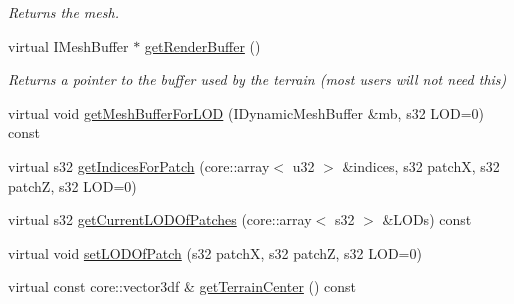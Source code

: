 \begin{DoxyCompactItemize}
\begin{DoxyCompactList}\small\item\em Returns the mesh. \end{DoxyCompactList}\item 
\hypertarget{classirr_1_1scene_1_1_c_terrain_scene_node_a78b649a7eec9d5cd9b84449858ab25fb}{virtual I\-Mesh\-Buffer $\ast$ \hyperlink{classirr_1_1scene_1_1_c_terrain_scene_node_a78b649a7eec9d5cd9b84449858ab25fb}{get\-Render\-Buffer} ()}\label{classirr_1_1scene_1_1_c_terrain_scene_node_a78b649a7eec9d5cd9b84449858ab25fb}

\begin{DoxyCompactList}\small\item\em Returns a pointer to the buffer used by the terrain (most users will not need this) \end{DoxyCompactList}\item 
virtual void \hyperlink{classirr_1_1scene_1_1_c_terrain_scene_node_a2867dd7ecb1150d4ccc8598542e59126}{get\-Mesh\-Buffer\-For\-L\-O\-D} (I\-Dynamic\-Mesh\-Buffer \&mb, s32 L\-O\-D=0) const 
\item 
virtual s32 \hyperlink{classirr_1_1scene_1_1_c_terrain_scene_node_a51de8d7ff1cfe4cf4d0dd288ab50c14c}{get\-Indices\-For\-Patch} (core\-::array$<$ u32 $>$ \&indices, s32 patch\-X, s32 patch\-Z, s32 L\-O\-D=0)
\item 
virtual s32 \hyperlink{classirr_1_1scene_1_1_c_terrain_scene_node_aa2832de1cc9bd349490473d151aea2c4}{get\-Current\-L\-O\-D\-Of\-Patches} (core\-::array$<$ s32 $>$ \&L\-O\-Ds) const 
\item 
virtual void \hyperlink{classirr_1_1scene_1_1_c_terrain_scene_node_a71fc289346513dfdaf17942e21ef967b}{set\-L\-O\-D\-Of\-Patch} (s32 patch\-X, s32 patch\-Z, s32 L\-O\-D=0)
\item 
\hypertarget{classirr_1_1scene_1_1_c_terrain_scene_node_a19359cbd20636918ae7ed2be4c6e9ee5}{virtual const core\-::vector3df \& \hyperlink{classirr_1_1scene_1_1_c_terrain_scene_node_a19359cbd20636918ae7ed2be4c6e9ee5}{get\-Terrain\-Center} () const }\label{classirr_1_1scene_1_1_c_terrain_scene_node_a19359cbd20636918ae7ed2be4c6e9ee5}


\end{DoxyCompactItemize}

